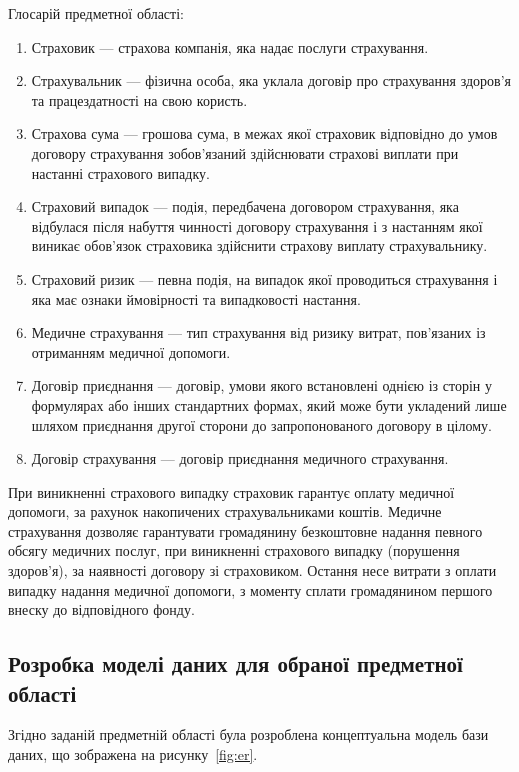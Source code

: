 Глосарій предметної області:
\begin{enumerate}
  \item Страховик --- страхова компанія, яка надає послуги страхування. 
  \item Страхувальник --- фізична особа, яка уклала договір про страхування здоров'я та працездатності на свою користь.
  \item Страхова сума --- грошова сума, в межах якої страховик відповідно до умов договору страхування зобов'язаний здійснювати страхові виплати при настанні страхового випадку. 
  \item Страховий випадок --- подія, передбачена договором страхування, яка відбулася після набуття чинності договору страхування і з настанням якої виникає обов'язок страховика здійснити страхову виплату страхувальнику.
  \item Страховий ризик --- певна подія, на випадок якої проводиться страхування і яка має ознаки ймовірності та випадковості настання.
  \item Медичне страхування --- тип страхування від ризику витрат, пов'язаних із отриманням медичної допомоги.
  \item Договір приєднання --- договір, умови якого встановлені однією із сторін у формулярах або інших стандартних формах, який може бути укладений лише шляхом приєднання другої сторони до запропонованого договору в цілому. 
  \item Договір страхування --- договір приєднання медичного страхування. 
\end{enumerate}

При виникненні страхового випадку страховик гарантує оплату медичної допомоги, за рахунок накопичених страхувальниками коштів. 
Медичне страхування дозволяє гарантувати громадянину безкоштовне надання певного обсягу медичних послуг, при виникненні страхового випадку (порушення здоров'я), за наявності договору зі страховиком. 
Остання несе витрати з оплати випадку надання медичної допомоги, з моменту сплати громадянином першого внеску до відповідного фонду.

\subsection{Розробка моделі даних для обраної предметної області}
Згідно заданій предметній області була розроблена концептуальна модель бази даних, що зображена на рисунку~\ref{fig:er}.

